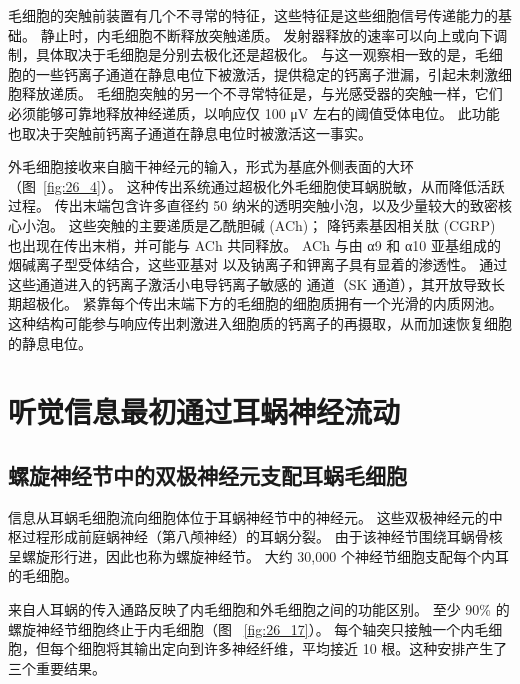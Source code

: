 毛细胞的突触前装置有几个不寻常的特征，这些特征是这些细胞信号传递能力的基础。
静止时，内毛细胞不断释放突触递质。
发射器释放的速率可以向上或向下调制，具体取决于毛细胞是分别去极化还是超极化。
与这一观察相一致的是，毛细胞的一些钙离子通道在静息电位下被激活，提供稳定的钙离子泄漏，引起未刺激细胞释放递质。
毛细胞突触的另一个不寻常特征是，与光感受器的突触一样，它们必须能够可靠地释放神经递质，以响应仅 100 μV 左右的阈值受体电位。
此功能也取决于突触前钙离子通道在静息电位时被激活这一事实。


外毛细胞接收来自脑干神经元的输入，形式为基底外侧表面的大环（图~\ref{fig:26_4}）。
这种传出系统通过超极化外毛细胞使耳蜗脱敏，从而降低活跃过程。
传出末端包含许多直径约 50 纳米的透明突触小泡，以及少量较大的致密核心小泡。
这些突触的主要递质是乙酰胆碱 (ACh)；
降钙素基因相关肽 (CGRP) 也出现在传出末梢，并可能与 ACh 共同释放。
ACh 与由 α9 和 α10 亚基组成的烟碱离子型受体结合，这些亚基对  以及钠离子和钾离子具有显着的渗透性。
通过这些通道进入的钙离子激活小电导钙离子敏感的  通道（SK 通道），其开放导致长期超极化。
紧靠每个传出末端下方的毛细胞的细胞质拥有一个光滑的内质网池。
这种结构可能参与响应传出刺激进入细胞质的钙离子的再摄取，从而加速恢复细胞的静息电位。



\section{听觉信息最初通过耳蜗神经流动}

\subsection{螺旋神经节中的双极神经元支配耳蜗毛细胞}

信息从耳蜗毛细胞流向细胞体位于耳蜗神经节中的神经元。
这些双极神经元的中枢过程形成前庭蜗神经（第八颅神经）的耳蜗分裂。
由于该神经节围绕耳蜗骨核呈螺旋形行进，因此也称为螺旋神经节。
大约 30,000 个神经节细胞支配每个内耳的毛细胞。


来自人耳蜗的传入通路反映了内毛细胞和外毛细胞之间的功能区别。
至少 90\% 的螺旋神经节细胞终止于内毛细胞（图 ~\ref{fig:26_17}）。
每个轴突只接触一个内毛细胞，但每个细胞将其输出定向到许多神经纤维，平均接近 10 根。这种安排产生了三个重要结果。


